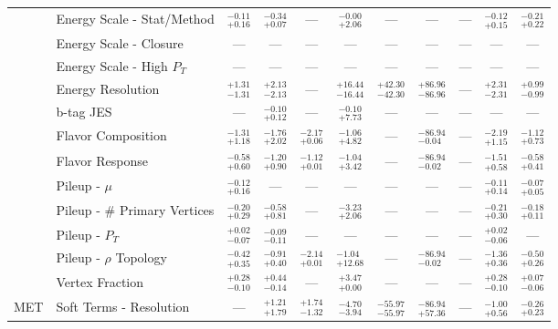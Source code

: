\begin{tabular}{|cl||ccccccc|c||c|}
\cline{2-11}
&Energy Scale - Stat/Method &  $^{-0.11}_{+0.16}$  &  $^{-0.34}_{+0.07}$  & --- &  $^{-0.00}_{+2.06}$  & --- & --- & --- &  $^{-0.12}_{+0.15}$  &  $^{-0.21}_{+0.22}$ \\ 
\cline{2-11}
&Energy Scale - Closure  & --- & --- & --- & --- & --- & --- & --- & --- & ---\\ 
\cline{2-11}
&Energy Scale - High $P_{T}$ & --- & --- & --- & --- & --- & --- & --- & --- & ---\\ 
\cline{2-11}
&Energy Resolution &  $^{+1.31}_{-1.31}$  &  $^{+2.13}_{-2.13}$  & --- &  $^{+16.44}_{-16.44}$  &  $^{+42.30}_{-42.30}$  &  $^{+86.96}_{-86.96}$  & --- &  $^{+2.31}_{-2.31}$  &  $^{+0.99}_{-0.99}$ \\ 
\cline{2-11}
&b-tag JES & --- &  $^{-0.10}_{+0.12}$  & --- &  $^{-0.10}_{+7.73}$  & --- & --- & --- & --- & ---\\ 
\cline{2-11}
&Flavor Composition &  $^{-1.31}_{+1.18}$  &  $^{-1.76}_{+2.02}$  &  $^{-2.17}_{+0.06}$  &  $^{-1.06}_{+4.82}$  & --- &  $^{-86.94}_{-0.04}$  & --- &  $^{-2.19}_{+1.15}$  &  $^{-1.12}_{+0.73}$ \\ 
\cline{2-11}
&Flavor Response &  $^{-0.58}_{+0.60}$  &  $^{-1.20}_{+0.90}$  &  $^{-1.12}_{+0.01}$  &  $^{-1.04}_{+3.42}$  & --- &  $^{-86.94}_{-0.02}$  & --- &  $^{-1.51}_{+0.58}$  &  $^{-0.58}_{+0.41}$ \\ 
\cline{2-11}
&Pileup - $\mu$ &  $^{-0.12}_{+0.16}$  & --- & --- & --- & --- & --- & --- &  $^{-0.11}_{+0.14}$  &  $^{-0.07}_{+0.05}$ \\ 
\cline{2-11}
&Pileup - \# Primary Vertices &  $^{-0.20}_{+0.29}$  &  $^{-0.58}_{+0.81}$  & --- &  $^{-3.23}_{+2.06}$  & --- & --- & --- &  $^{-0.21}_{+0.30}$  &  $^{-0.18}_{+0.11}$ \\ 
\cline{2-11}
&Pileup -  $P_{T}$ &  $^{+0.02}_{-0.07}$  &  $^{-0.09}_{-0.11}$  & --- & --- & --- & --- & --- &  $^{+0.02}_{-0.06}$  & ---\\ 
\cline{2-11}
&Pileup - $\rho$ Topology &  $^{-0.42}_{+0.35}$  &  $^{-0.91}_{+0.40}$  &  $^{-2.14}_{+0.01}$  &  $^{-1.04}_{+12.68}$  & --- &  $^{-86.94}_{-0.02}$  & --- &  $^{-1.36}_{+0.36}$  &  $^{-0.50}_{+0.26}$ \\ 
\cline{2-11}
&Vertex Fraction &  $^{+0.28}_{-0.10}$  &  $^{+0.44}_{-0.14}$  & --- &  $^{+3.47}_{+0.00}$  & --- & --- & --- &  $^{+0.28}_{-0.10}$  &  $^{+0.07}_{-0.06}$ \\ 
\hline
\multirow{2}{*}{MET}
&Soft Terms - Resolution & --- &  $^{+1.21}_{+1.79}$  &  $^{+1.74}_{-1.32}$  &  $^{-4.70}_{-3.94}$  &  $^{-55.97}_{-55.97}$  &  $^{-86.94}_{+57.36}$  & --- &  $^{-1.00}_{+0.56}$  &  $^{-0.26}_{+0.23}$ \\ 

\end{tabular}
